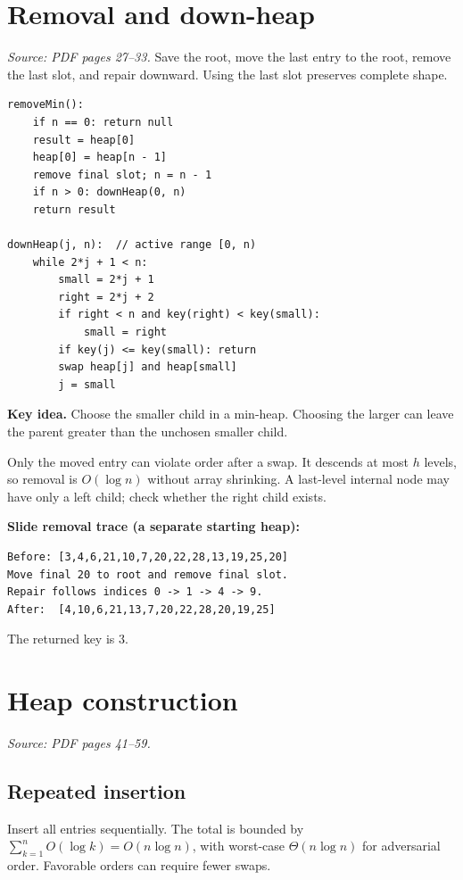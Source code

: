 \documentclass[11pt,letterpaper]{article}
\newcommand{\sourcepages}[1]{\textit{Source: PDF pages #1.}}
\newcommand{\keyidea}[1]{\par\textbf{Key idea.} #1\par}
\begin{document}
\section{Removal and down-heap}
\sourcepages{27--33}
Save the root, move the last entry to the root, remove the last slot, and repair downward. Using the last slot preserves complete shape.
\par\noindent\begin{minipage}{\linewidth}
\begin{lstlisting}
removeMin():
    if n == 0: return null
    result = heap[0]
    heap[0] = heap[n - 1]
    remove final slot; n = n - 1
    if n > 0: downHeap(0, n)
    return result

downHeap(j, n):  // active range [0, n)
    while 2*j + 1 < n:
        small = 2*j + 1
        right = 2*j + 2
        if right < n and key(right) < key(small):
            small = right
        if key(j) <= key(small): return
        swap heap[j] and heap[small]
        j = small
\end{lstlisting}
\end{minipage}\par
\keyidea{Choose the smaller child in a min-heap. Choosing the larger can leave the parent greater than the unchosen smaller child.}
Only the moved entry can violate order after a swap. It descends at most $h$ levels, so removal is $O(\log n)$ without array shrinking. A last-level internal node may have only a left child; check whether the right child exists.

\textbf{Slide removal trace (a separate starting heap):}
\par\noindent\begin{minipage}{\linewidth}
\begin{lstlisting}
Before: [3,4,6,21,10,7,20,22,28,13,19,25,20]
Move final 20 to root and remove final slot.
Repair follows indices 0 -> 1 -> 4 -> 9.
After:  [4,10,6,21,13,7,20,22,28,20,19,25]
\end{lstlisting}
\end{minipage}\par
The returned key is $3$.

\section{Heap construction}
\sourcepages{41--59}
\subsection{Repeated insertion}
Insert all entries sequentially. The total is bounded by $\sum_{k=1}^nO(\log k)=O(n\log n)$, with worst-case $\Theta(n\log n)$ for adversarial order. Favorable orders can require fewer swaps.
\end{document}
